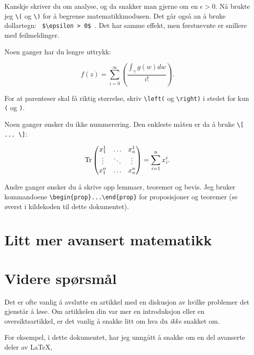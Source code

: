 \documentclass[11pt, english, a4paper]{article}
\begin{document}
Kanskje skriver du om analyse, og da snakker man gjerne om en \(\epsilon > 0 \). Nå brukte jeg \verb|\(| og \verb|\)| for å begrense matematikkmodusen. Det går også an å bruke dollartegn: \verb| $\epsilon > 0$ |. Det har samme effekt, men førstnevnte er snillere med feilmeldinger.

Noen ganger har du lengre uttrykk:

\begin{equation}
f(z) = \sum_{i=0}^\infty \left( 
\frac{\int_\gamma g(w) dw}{i!}
\right).
\end{equation}

For at parenteser skal få riktig størrelse, skriv \verb|\left(| og \verb|\right)| i stedet for kun \texttt{(} og \texttt{)}.

Noen ganger ønsker du ikke nummerering. Den enkleste måten er da å bruke \verb|\[ ... \]|:

\[
\operatorname{Tr} \begin{pmatrix}
x_1^1 & \hdots & x_n^1 \\
\vdots & \ddots &  \vdots \\
x_1^n & \hdots & x_n^n
\end{pmatrix} = \sum_{i=1}^n x_i^i.
\]

Andre ganger ønsker du å skrive opp lemmaer, teoremer og bevis. Jeg bruker kommandoene \verb|\begin{prop}...\end{prop}| for proposisjoner og teoremer (se øverst i kildekoden til dette dokumentet). 

\section{Litt mer avansert matematikk}

\section{Videre spørsmål}

Det er ofte vanlig å avslutte en artikkel med en diskusjon av hvilke problemer det gjenstår å løse. Om artikkelen din var mer en introduksjon eller en oversiktsartikkel, er det vanlig å snakke litt om hva du \emph{ikke} snakket om.

For eksempel, i dette dokumentet, har jeg unngått å snakke om en del avanserte deler av \LaTeX, 
\end{document}
